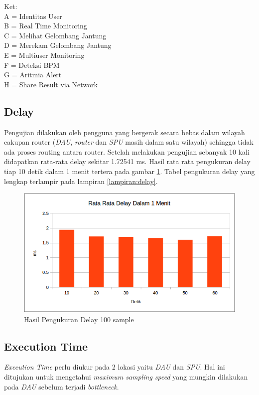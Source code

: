 Ket: \\
A = Identitas User \\
B = Real Time Monitoring \\
C = Melihat Gelombang Jantung \\
D = Merekam Gelombang Jantung \\
E = Multiuser Monitoring \\
F = Deteksi BPM \\
G = Aritmia Alert \\
H = Share Result via Network\\

\subsection{Delay}
Pengujian dilakukan oleh pengguna yang bergerak secara bebas dalam wilayah cakupan router (\textit{DAU}, \textit{router} dan \textit{SPU} masih dalam satu wilayah) sehingga tidak ada proses routing antara router. Setelah melakukan pengujian sebanyak 10 kali didapatkan rata-rata delay sekitar 1.72541 ms. Hasil rata rata pengukuran delay tiap 10 detik dalam 1 menit tertera pada gambar \ref{fig:delay}. Tabel pengukuran delay yang lengkap terlampir pada lampiran \ref{lampiran:delay}.

\begin{figure}[H]
	\centering
	\includegraphics[scale=0.5]{images/delay1.png}
	\caption{Hasil Pengukuran Delay 100 sample}
	\label{fig:delay}
\end{figure}

\subsection{Execution Time}
\textit{Execution Time} perlu diukur pada 2 lokasi yaitu \textit{DAU} dan \textit{SPU}. Hal ini ditujukan untuk mengetahui \textit{maximum sampling speed} yang mungkin dilakukan pada \textit{DAU} sebelum terjadi \textit{bottleneck}. 

